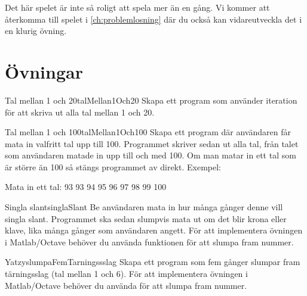 Det här spelet är inte så roligt att spela mer än en gång. Vi kommer att återkomma till spelet i \autoref{ch:problemlosning} där du också kan vidareutveckla det i en klurig övning.


\section{Övningar}

\begin{matteovning}{Tal mellan 1 och 20}{talMellan1Och20}
Skapa ett program som använder iteration för att skriva ut alla tal mellan 1 och 20.
\end{matteovning}

\begin{matteovning}{Tal mellan 1 och 100}{talMellan1Och100}
Skapa ett program där användaren får mata in valfritt tal upp till 100. Programmet skriver sedan ut alla tal, från talet som användaren matade in upp till och med 100. Om man matar in ett tal som är större än 100 så stängs programmet av direkt.
\newline
\newline
Exempel:
\vspace{10pt}
\begin{matlab}
Mata in ett tal: 93
93
94
95
96
97
98
99
100
\end{matlab}
\end{matteovning}

\begin{matteovning}{Singla slant}{singlaSlant}
Be användaren mata in hur många gånger denne vill singla slant. Programmet ska sedan slumpvis mata ut om det blir krona eller klave, lika många gånger som användaren angett.
\newline
\newline
För att implementera övningen i Matlab/Octave behöver du använda funktionen  för att slumpa fram nummer.
\end{matteovning}

\begin{matteovning}{Yatzy}{slumpaFemTarningssslag}
Skapa ett program som fem gånger slumpar fram tärningsslag (tal mellan 1 och 6).
\newline
\newline
För att implementera övningen i Matlab/Octave behöver du använda  för att slumpa fram nummer.
\end{matteovning}

